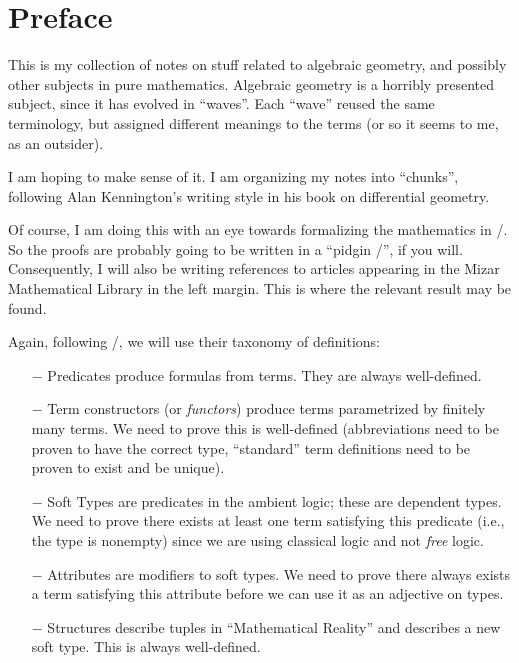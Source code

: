 
\chapter{Preface}

\begin{remark}
This is my collection of notes on stuff related to algebraic geometry,
and possibly other subjects in pure mathematics. Algebraic geometry is
a horribly presented subject, since it has evolved in ``waves''. Each
``wave'' reused the same terminology, but assigned different meanings
to the terms (or so it seems to me, as an outsider).

I am hoping to make sense of it. I am organizing my notes into
``chunks'', following Alan Kennington's writing style in his book on
differential geometry.

Of course, I am doing this with an eye towards formalizing the
mathematics in \Mizar/. So the proofs are probably going to be written
in a ``pidgin \Mizar/'', if you will. Consequently, I will also be
writing references to articles appearing in the Mizar Mathematical
Library in the left margin. This is where the relevant result may be found.
\end{remark}

\begin{remark}
Again, following \Mizar/, we will use their taxonomy of definitions:
\begin{itemize}
\item[$-$] Predicates produce formulas from terms. They are always
  well-defined. 
\item[$-$] Term constructors (or \emph{functors}) produce terms
  parametrized by finitely many terms. We need to prove this is
  well-defined (abbreviations need to be proven to have the correct
  type, ``standard'' term definitions need to be proven to exist and
  be unique).
\item[$-$] Soft Types are predicates in the ambient logic; these are
  dependent types. We need to prove there exists at least one term
  satisfying this predicate (i.e., the type is nonempty) since we are
  using classical logic and not \emph{free} logic.
\item[$-$] Attributes are modifiers to soft types. We need to prove
  there always exists a term satisfying this attribute before we can
  use it as an adjective on types.
\item[$-$] Structures describe tuples in ``Mathematical Reality'' and
  describes a new soft type. This is always well-defined.
\end{itemize}%
\end{remark}

